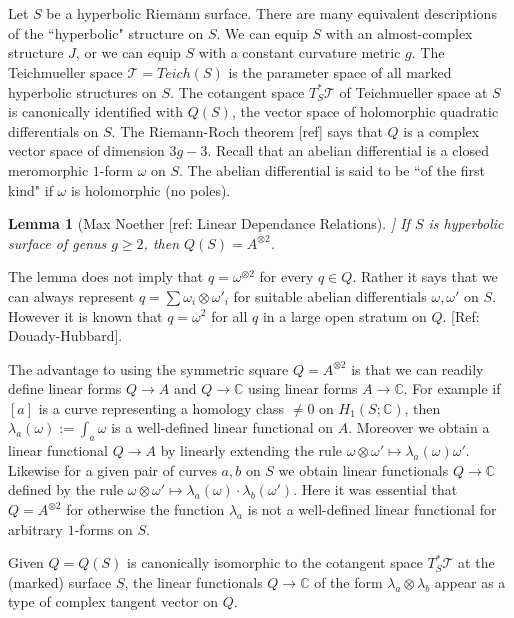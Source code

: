 \documentclass[12pt]{article}
\newtheorem{lem}[thm]{Lemma}
\theoremstyle{definition}
\theoremstyle{remark}
\newcommand{\bC}{\mathbb{C}}
\newcommand{\sT}{\mathscr{T}}
\begin{document}
\section{}
Let $S$ be a hyperbolic Riemann surface. There are many equivalent descriptions of the ``hyperbolic" structure on $S$. We can equip $S$ with an almost-complex structure $J$, or we can equip $S$ with a constant curvature metric $g$. The Teichmueller space $\sT=Teich(S)$ is the parameter space of all marked hyperbolic structures on $S$. The cotangent space $T^*_S\sT$ of Teichmueller space at $S$ is canonically identified with $Q(S)$, the vector space of holomorphic quadratic differentials on $S$. The Riemann-Roch theorem [ref] says that $Q$ is a complex vector space of dimension $3g-3$. Recall that an abelian differential is a closed meromorphic $1$-form $\omega$ on $S$. The abelian differential is said to be ``of the first kind" if $\omega$ is holomorphic (no poles). 

\begin{lem}[Max Noether [ref: Linear Dependance Relations]]
If $S$ is hyperbolic surface of genus $g\geq 2$, then $Q(S)=A^{\otimes 2}$. 
\end{lem} 
The lemma does not imply that $q=\omega^{\otimes 2}$ for every $q\in Q$. Rather it says that we can always represent $q=\sum \omega_i \otimes \omega'_i$ for suitable abelian differentials $\omega, \omega'$ on $S$. However it is known that $q=\omega^2$ for all $q$ in a large open stratum on $Q$. [Ref: Douady-Hubbard].

The advantage to using the symmetric square $Q=A^{\otimes 2}$ is that we can readily define linear forms $Q\to A$ and $Q \to \bC$ using linear forms $A \to \bC$. For example if $[a]$ is a curve representing a homology class $\neq 0$ on $H_1(S; \bC)$, then $\lambda_a(\omega):=\int_a \omega$ is a well-defined linear functional on $A$. Moreover we obtain a linear functional $Q \to A$ by linearly extending the rule $\omega\otimes \omega' \mapsto \lambda_a(\omega)\omega'$. Likewise for a given pair of curves $a,b$ on $S$ we obtain linear functionals $Q \to \bC$ defined by the rule $\omega \otimes \omega' \mapsto \lambda_a(\omega) \cdot \lambda_b (\omega')$. Here it was essential that $Q=A^{\otimes 2}$ for otherwise the function $\lambda_a$ is not a well-defined linear functional for arbitrary $1$-forms on $S$. 
 
Given $Q=Q(S)$ is canonically isomorphic to the cotangent space $T^*_S \sT$ at the (marked) surface $S$, the linear functionals $Q \to \bC$ of the form $\lambda_a \otimes \lambda_b$ appear as a type of complex tangent vector on $Q$.
\end{document}
